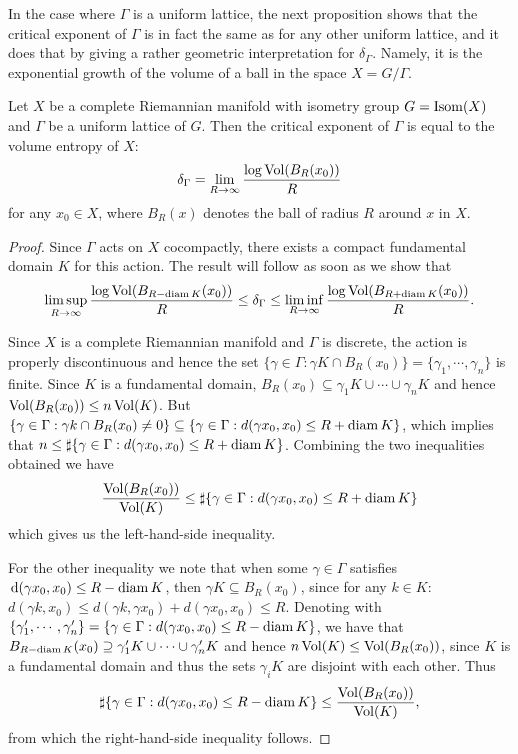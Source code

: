 \documentclass{report}
\begin{document}
In the case where $\Gamma$ is a uniform lattice, the next proposition shows that the critical exponent of $\Gamma$ is in fact the same as for any other uniform lattice, and it does that by giving a rather geometric interpretation for $\delta_\Gamma$.
Namely, it is the exponential growth of the volume of a ball in the space $X = G/\Gamma$.
\begin{lemma}\label{lem:critical_exponent_entropy}
    Let $X$ be a complete Riemannian manifold with isometry group $G= \operatorname{Isom}(X)$ and 
    $\Gamma$ be a uniform lattice of $G$.
    Then the critical exponent of $\Gamma$ is equal to the volume entropy of $X$:
    \[
    \delta_\Gamma = \lim_{R \to \infty} \frac{\log \operatorname{Vol}(B_R(x_0))}{R}
    \]
    for any $x_0 \in X$, where $B_R(x)$ denotes the ball of radius $R$ around $x$ in $X$.
\end{lemma}
\begin{proof}
    Since $\Gamma$ acts on $X$ cocompactly, there exists a compact fundamental domain $K$ for this action.
    The result will follow as soon as we show that 
    \begin{align*}
        \limsup_{R \to \infty} \frac{\log \operatorname{Vol}(B_{R-\operatorname{diam} K}(x_0))}{R} \leq \delta_\Gamma \leq
        \liminf_{R \to \infty} \frac{\log \operatorname{Vol}(B_{R + \operatorname{diam} K}(x_0))}{R}.
    \end{align*}

    Since $X$ is a complete Riemannian manifold and $\Gamma$ is discrete, the action is properly discontinuous and hence the set $\{\gamma \in \Gamma : \gamma K \cap B_R(x_0)\} = \{ \gamma_1, \cdots, \gamma_n\}$ is finite.
    Since $K$ is a fundamental domain, $B_R(x_0) \subseteq \gamma_1 K \cup \cdots \cup \gamma_n K$ and hence $\operatorname{Vol}(B_R(x_0)) \leq n  \operatorname{Vol}(K)$.
    But $ \{\gamma \in \Gamma: \gamma k \cap B_R(x_0) \neq 0 \} \subseteq \{ \gamma \in \Gamma : d(\gamma x_0 , x_0) \leq R + \operatorname{diam} K \}$, which implies that $n \leq \sharp \{ \gamma \in \Gamma : d(\gamma x_0, x_0) \leq R + \operatorname{diam} K \}$.
    Combining the two inequalities obtained we have
    \begin{equation*}
        \frac{\operatorname{Vol}(B_R(x_0))}{\operatorname{Vol}(K)} \leq \sharp \{\gamma \in \Gamma : d(\gamma x_0, x_0) \leq R+ \operatorname{diam} K\}
    \end{equation*}
    which gives us the left-hand-side inequality.

    For the other inequality we note that when some $\gamma \in \Gamma$ satisfies $\,\mathrm{d}(\gamma x_0, x_0) \leq R - \operatorname{diam} K$, then $\gamma K \subseteq B_R(x_0)$, since for any $k \in K$:
    $d(\gamma k, x_0) \leq d(\gamma k, \gamma x_0) + d(\gamma x_0, x_0) \leq R$.
    Denoting with $\{ \gamma_1', \cdots, \gamma_n' \} = \{ \gamma \in \Gamma : d(\gamma x_0, x_0) \leq R - \operatorname{diam} K \}$, we have that $B_{R-\operatorname{diam} K}(x_0) \supseteq \gamma_1' K \cup \cdots \cup \gamma_n' K$ and hence $n \operatorname{Vol}(K) \leq \operatorname{Vol}(B_R(x_0))$, since $K$ is a fundamental domain and thus the sets $\gamma_i K$ are disjoint with each other.
    Thus
    \[
    \sharp \{ \gamma \in \Gamma : d(\gamma x_0, x_0) \leq R - \operatorname{diam} K \} \leq \frac{\operatorname{Vol}(B_R(x_0))}{\operatorname{Vol}(K)},
    \]
    from which the right-hand-side inequality follows.
\end{proof}
\end{document}
